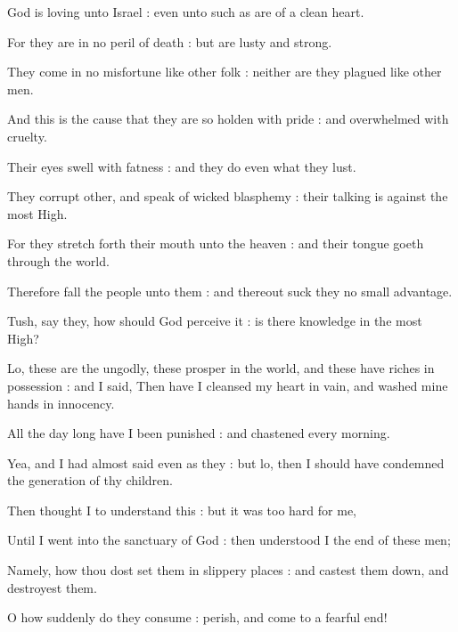 

 God is loving unto Israel : even unto such as are of a clean heart.\par
{}
For they are in no peril of death : but are lusty and strong.\par
{}They come in no misfortune like other folk : neither are they plagued like other men.\par
{}And this is the cause that they are so holden with pride : and overwhelmed with cruelty.\par
{}Their eyes swell with fatness : and they do even what they lust.\par
{}They corrupt other, and speak of wicked blasphemy : their talking is against the most High.\par
{}For they stretch forth their mouth unto the heaven : and their tongue goeth through the world.\par
{}Therefore fall the people unto them : and thereout suck they no small advantage.\par
{}Tush, say they, how should God perceive it : is there knowledge in the most High?\par
{}Lo, these are the ungodly, these prosper in the world, and these have riches in possession : and I said, Then have I cleansed my heart in vain, and washed mine hands in innocency.\par
{}All the day long have I been punished : and chastened every morning.\par
{}Yea, and I had almost said even as they : but lo, then I should have condemned the generation of thy children.\par
{}Then thought I to understand this : but it was too hard for me,\par
{}Until I went into the sanctuary of God : then understood I the end of these men;\par
{}Namely, how thou dost set them in slippery places : and castest them down, and destroyest them.\par
{}O how suddenly do they consume : perish, and come to a fearful end!\par
